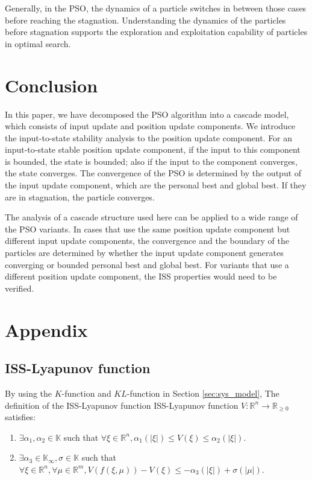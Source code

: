 \documentclass{sig-alternate}
\begin{document}
Generally, in the PSO, the dynamics of a particle switches in between those cases before reaching the stagnation.
Understanding the dynamics of the particles before stagnation supports the exploration and exploitation capability of particles in optimal search.

\section{Conclusion}
\label{sec:conclusion}

In this paper, we have decomposed the PSO algorithm into a cascade model, which consists of input update and position update components.
We introduce the input-to-state stability analysis to the position update component.
For an input-to-state stable position update component, if the input to this component is bounded, the state is bounded; also if the input to the component converges, the state converges.
The convergence of the PSO is determined by the output of the input update component, which are the personal best and global best.
If they are in stagnation, the particle converges.

The analysis of a cascade structure used here can be applied to a wide range of the PSO variants.
In cases that use the same position update component but different input update components, the convergence and the boundary of the particles are determined by
whether the input update component generates converging or bounded personal best and global best.
For variants that use a different position update component, the ISS properties would need to be verified.

\section*{Appendix}
\label{sec:appendix}

\subsection{ISS-Lyapunov function}
\label{sec:iss_lyapunov:func}

By using the $ K $-function and $ KL $-function in Section \ref{sec:sys_model}, 
The definition of the ISS-Lyapunov function 
ISS-Lyapunov function $ V : \mathbb{R}^{n} \rightarrow \mathbb{R}_{\geq 0} $ satisfies:
\begin{enumerate}
\item $ \exists \alpha_{1}, \alpha_{2} \in \mathbb{K} $ such that 
$ \forall \xi \in \mathbb{R}^{n}, \alpha_{1} ( | \xi | ) \leq V( \xi ) \leq \alpha_{2}  ( | \xi | ) $.
\item $ \exists \alpha_{3} \in \mathbb{K}_{\infty} , \sigma \in \mathbb{K} $ such that $ \forall \xi \in \mathbb{R}^{n}, \forall \mu \in \mathbb{R}^{m}, V( f( \xi, \mu ) ) - V( \xi ) \leq - \alpha_{3} ( | \xi | ) + \sigma ( | \mu | ) $. 
\end{enumerate}
\end{document}
